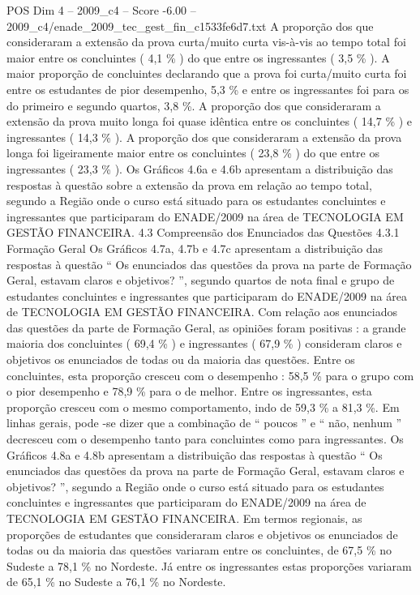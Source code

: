 \begin{textsample}{POS Dim 4 – 2009\_c4 – Score -6.00 – 2009\_c4/enade\_2009\_tec\_gest\_fin\_c1533fe6d7.txt}
A proporção dos que consideraram a extensão da prova curta/muito curta vis-à-vis ao tempo total foi maior entre os concluintes ( 4,1 \% ) do que entre os ingressantes ( 3,5 \% ).
A maior proporção de concluintes declarando que a prova foi curta/muito curta foi entre os estudantes de pior desempenho, 5,3 \% e entre os ingressantes foi para os do primeiro e segundo quartos, 3,8 \%.
A proporção dos que consideraram a extensão da prova muito longa foi quase idêntica entre os concluintes ( 14,7 \% ) e ingressantes ( 14,3 \% ).
A proporção dos que consideraram a extensão da prova longa foi ligeiramente maior entre os concluintes ( 23,8 \% ) do que entre os ingressantes ( 23,3 \% ).
Os Gráficos 4.6a e 4.6b apresentam a distribuição das respostas à questão sobre a extensão da prova em relação ao tempo total, segundo a Região onde o curso está situado para os estudantes concluintes e ingressantes que participaram do ENADE/2009 na área de TECNOLOGIA EM GESTÃO FINANCEIRA. 4.3 Compreensão dos Enunciados das Questões 4.3.1 Formação Geral Os Gráficos 4.7a, 4.7b e 4.7c apresentam a distribuição das respostas à questão “ Os enunciados das questões da prova na parte de Formação Geral, estavam claros e objetivos? ”, segundo quartos de nota final e grupo de estudantes concluintes e ingressantes que participaram do ENADE/2009 na área de TECNOLOGIA EM GESTÃO FINANCEIRA.
Com relação aos enunciados das questões da parte de Formação Geral, as opiniões foram positivas : a grande maioria dos concluintes ( 69,4 \% ) e ingressantes ( 67,9 \% ) consideram claros e objetivos os enunciados de todas ou da maioria das questões.
Entre os concluintes, esta proporção cresceu com o desempenho : 58,5 \% para o grupo com o pior desempenho e 78,9 \% para o de melhor.
Entre os ingressantes, esta proporção cresceu com o mesmo comportamento, indo de 59,3 \% a 81,3 \%.
Em linhas gerais, pode -se dizer que a combinação de “ poucos ” e “ não, nenhum ” decresceu com o desempenho tanto para concluintes como para ingressantes.
Os Gráficos 4.8a e 4.8b apresentam a distribuição das respostas à questão “ Os enunciados das questões da prova na parte de Formação Geral, estavam claros e objetivos? ”, segundo a Região onde o curso está situado para os estudantes concluintes e ingressantes que participaram do ENADE/2009 na área de TECNOLOGIA EM GESTÃO FINANCEIRA.
Em termos regionais, as proporções de estudantes que consideraram claros e objetivos os enunciados de todas ou da maioria das questões variaram entre os concluintes, de 67,5 \% no Sudeste a 78,1 \% no Nordeste.
Já entre os ingressantes estas proporções variaram de 65,1 \% no Sudeste a 76,1 \% no Nordeste.

\end{textsample}

